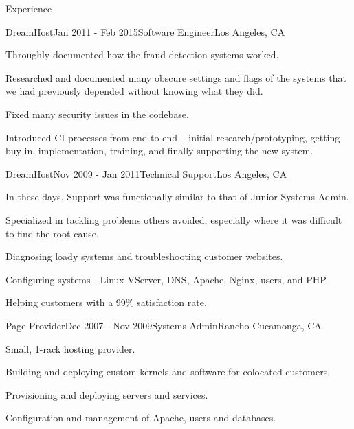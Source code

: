 \documentclass{resume} %
\begin{document}
\begin{rSection}{Experience}
\begin{rSubsection}{DreamHost}{Jan 2011 - Feb 2015}{Software Engineer}{Los Angeles, CA}
\item Throughly documented how the fraud detection systems worked.
\item Researched and documented many obscure settings and flags of the systems that we had previously depended without knowing what they did.
\item Fixed many security issues in the codebase.
\item Introduced CI processes from end-to-end -- initial research/prototyping, getting buy-in, implementation, training, and finally supporting the new system.
\end{rSubsection}


\begin{rSubsection}{DreamHost}{Nov 2009 - Jan 2011}{Technical Support}{Los Angeles, CA}
\item In these days, Support was functionally similar to that of Junior Systems Admin.
\item Specialized in tackling problems others avoided, especially where it was difficult to find the root cause.
\item Diagnosing loady systems and troubleshooting customer websites.
\item Configuring systems - Linux-VServer, DNS, Apache, Nginx, users, and PHP.
\item Helping customers with a 99\% satisfaction rate.
\end{rSubsection}


\begin{rSubsection}{Page Provider}{Dec 2007 - Nov 2009}{Systems Admin}{Rancho Cucamonga, CA}
\item Small, 1-rack hosting provider.
\item Building and deploying custom kernels and software for colocated customers.
\item Provisioning and deploying servers and services.
\item Configuration and management of Apache, users and databases.
\end{rSubsection}

\end{rSection}

\end{document}
